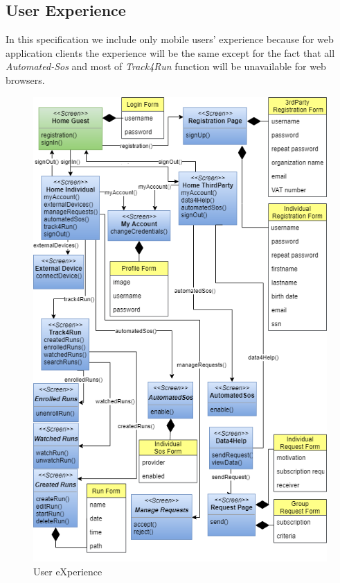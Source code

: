 \documentclass[a4paper]{article}
\begin{document}
\subsection{User Experience}
    In this specification we include only mobile users' experience because for web application clients the experience will be the same except for the fact that all \textit{Automated-Sos} and most of \textit{Track4Run} function will be unavailable for web browsers.
    \begin{figure}[!htpb]
    	\centering
    	\includegraphics[width=\textwidth, height=0.5\paperheight]{images/ux/ux_TrackMe.png}
    	\caption{User eXperience}
    \end{figure}
\end{document}
